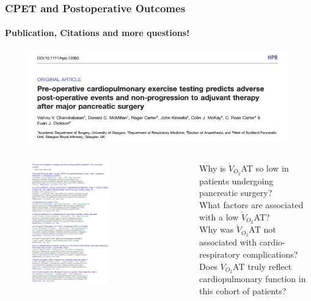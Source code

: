 \documentclass[10pt]{beamer}
\begin{document}
\begin{frame}
	\frametitle{CPET and Postoperative Outcomes}
	\framesubtitle{Publication, Citations and more questions!}
	
	\begin{figure}
		\includegraphics[width=0.6\linewidth]{cpet_hpb_publication}
	\end{figure}

	\begin{columns}[c]
			\begin{figure}
				\includegraphics[width=0.6\textwidth]{cpet_citations}
			\end{figure}
	
			{\footnotesize 	Why is $\dot{V}_{O_2}$AT so low in patients undergoing pancreatic surgery?\\
				\medskip
				What factors are associated with a low $\dot{V}_{O_2}$AT?\\
				\medskip
				Why was $\dot{V}_{O_2}$AT not associated with cardio-respiratory complications?\\
				\medskip
				Does $\dot{V}_{O_2}$AT truly reflect cardiopulmonary function in this cohort of patients?\\	
			}
			
	\end{columns}
\end{frame}
\end{document}

